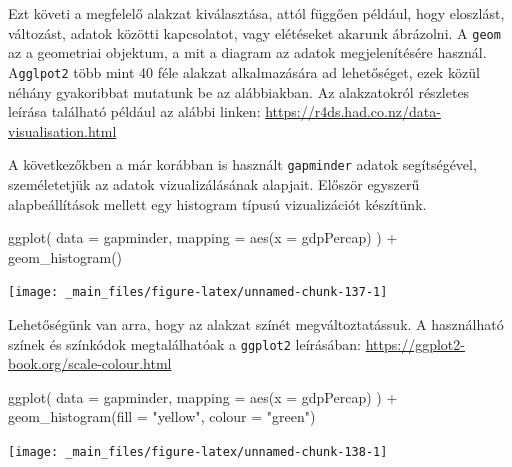 \documentclass[
]{book}
\newenvironment{Shaded}{\begin{snugshade}}{\end{snugshade}}
\newcommand{\AttributeTok}[1]{\textcolor[rgb]{0.77,0.63,0.00}{#1}}
\newcommand{\FunctionTok}[1]{\textcolor[rgb]{0.00,0.00,0.00}{#1}}
\newcommand{\NormalTok}[1]{#1}
\newcommand{\SpecialCharTok}[1]{\textcolor[rgb]{0.00,0.00,0.00}{#1}}
\newcommand{\StringTok}[1]{\textcolor[rgb]{0.31,0.60,0.02}{#1}}
\begin{document}
Ezt követi a megfelelő alakzat kiválasztása, attól függően például, hogy
eloszlást, változást, adatok közötti kapcsolatot, vagy elétéseket
akarunk ábrázolni. A \texttt{geom} az a geometriai objektum, a mit a
diagram az adatok megjelenítésére használ. A\texttt{gglpot2} több mint
40 féle alakzat alkalmazására ad lehetőséget, ezek közül néhány
gyakoribbat mutatunk be az alábbiakban. Az alakzatokról részletes
leírása található például az alábbi linken:
\url{https://r4ds.had.co.nz/data-visualisation.html}

A következőkben a már korábban is használt \texttt{gapminder} adatok
segítségével, személetetjük az adatok vizualizálásának alapjait. Először
egyszerű alapbeállítások mellett egy histogram típusú vizualizációt
készítünk.

\begin{Shaded}
\begin{Highlighting}[]
\FunctionTok{ggplot}\NormalTok{(}
  \AttributeTok{data =}\NormalTok{ gapminder,}
  \AttributeTok{mapping =} \FunctionTok{aes}\NormalTok{(}\AttributeTok{x =}\NormalTok{ gdpPercap)}
\NormalTok{) }\SpecialCharTok{+}
  \FunctionTok{geom\_histogram}\NormalTok{()}
\end{Highlighting}
\end{Shaded}

\begin{center}\texttt{[image: \_main\_files/figure-latex/unnamed-chunk-137-1]} \end{center}

Lehetőségünk van arra, hogy az alakzat színét megváltoztatássuk. A
használható színek és színkódok megtalálhatóak a \texttt{ggplot2}
leírásában: \url{https://ggplot2-book.org/scale-colour.html}

\begin{Shaded}
\begin{Highlighting}[]
\FunctionTok{ggplot}\NormalTok{(}
  \AttributeTok{data =}\NormalTok{ gapminder,}
  \AttributeTok{mapping =} \FunctionTok{aes}\NormalTok{(}\AttributeTok{x =}\NormalTok{ gdpPercap)}
\NormalTok{) }\SpecialCharTok{+}
  \FunctionTok{geom\_histogram}\NormalTok{(}\AttributeTok{fill =} \StringTok{"yellow"}\NormalTok{, }\AttributeTok{colour =} \StringTok{"green"}\NormalTok{)}
\end{Highlighting}
\end{Shaded}

\begin{center}\texttt{[image: \_main\_files/figure-latex/unnamed-chunk-138-1]} \end{center}
\end{document}
